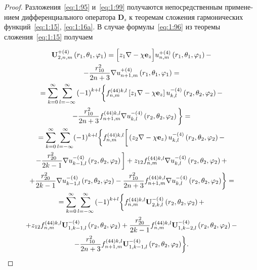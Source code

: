 \begin{russian}
\begin{proof}
Разложения~\eqref{eq:1:95} и~\eqref{eq:1:99} получаются непосредственным применением дифференциального оператора $\mathbf{D}_s$ к теоремам сложения гармонических функций~\eqref{eq:1:15}, \eqref{eq:1:16a}. В случае формулы~\eqref{eq:1:96} из теоремы сложения~\eqref{eq:1:15} получаем

\begin{multline}\label{eq:1:102}
{\bf{U}}_{2,n,m}^{ + (4)}\left( {{r_1},{\theta _1},{\varphi _1}} \right) = \Big[ {{z_1}\nabla  - \chi {{\bf{e}}_z}} \Big]u_{n,m}^{ + (4)}\left( {{r_1},{\theta _1},{\varphi _1}} \right) - \\
- \frac{{r_{10}^2}}{{2n + 3}}\nabla u_{n + 1,m}^{ + (4)}\left( {{r_1},{\theta _1},{\varphi _1}} \right) = \\
= \sum\limits_{k = 0}^\infty  {\sum\limits_{l =  - \infty }^\infty  {{{( - 1)}^{k + l}}} } \bigg\{ f_{n,m}^{(44)k,l}\left[ {{z_1}\nabla  - \chi {{\bf{e}}_z}} \right]u_{k,l}^{ - (4)}\left( {{r_2},{\theta _2},{\varphi _2}} \right) - \\
- \frac{{r_{10}^2}}{{2n + 3}}f_{n + 1,m}^{(44)k,l}\nabla u_{k,l}^{ - (4)}\left( {{r_2},{\theta _2},{\varphi _2}} \right) \bigg\} = \\
= \sum\limits_{k = 0}^\infty\sum\limits_{l = -\infty}^\infty(-1)^{k + l} \bigg\{f_{n,m}^{(44)k,l}\bigg[\left({z_2}\nabla  - \chi {{\bf{e}}_z}\right)u_{k,l}^{ - (4)}\left( {{r_2},{\theta _2},{\varphi _2}} \right) - \\
- \frac{{r_{20}^2}}{{2k - 1}}\nabla u_{k - 1,l}^{ - (4)}\left( {{r_2},{\theta _2},{\varphi _2}} \right) \bigg] + {z_{12}}f_{n,m}^{(44)k,l}\nabla u_{k,l}^{ - (4)}\left( {{r_2},{\theta _2},{\varphi _2}} \right) + \\
\left. { + \frac{{r_{20}^2}}{{2k - 1}}\nabla u_{k - 1,l}^{ - (4)}\left( {{r_2},{\theta _2},{\varphi _2}} \right) - \frac{{r_{10}^2}}{{2n + 3}}f_{n + 1,m}^{(44)k,l}\nabla u_{k,l}^{ - (4)}\left( {{r_2},{\theta _2},{\varphi _2}} \right)} \right\} = \\
= \sum\limits_{k = 0}^\infty  {\sum\limits_{l =  - \infty }^\infty  {{{( - 1)}^{k + l}}} } \bigg\{ {f_{n,m}^{(44)k,l}{\bf{U}}_{2,k,l}^{ - (4)}\left( {{r_2},{\theta _2},{\varphi _2}} \right) + } \\
+ {z_{12}}f_{n,m}^{(44)k,l}{\bf{U}}_{1,k - 1,l}^{ - (4)}\left( {{r_2},{\theta _2},{\varphi _2}} \right) + \frac{{r_{20}^2}}{{2k - 1}}f_{n,m}^{(44)k,l}{\bf{U}}_{1,k - 2,l}^{ - (4)}\left( {{r_2},{\theta _2},{\varphi _2}} \right) - \\
{ - \frac{{r_{10}^2}}{{2n + 3}}f_{n + 1,m}^{(44)k,l}{\bf{U}}_{1,k - 1,l}^{ - (4)}\left( {{r_2},{\theta _2},{\varphi _2}} \right)} \bigg\}.
\end{multline}


\end{proof}
\end{russian}
